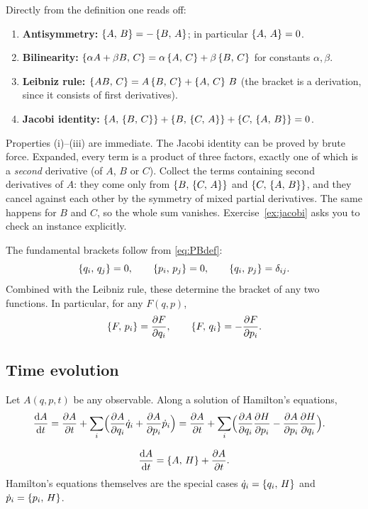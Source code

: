 \documentclass[11pt]{article}
\begin{document}
Directly from the definition one reads off:
\begin{enumerate}[label=(\roman*),nosep]
 \item \textbf{Antisymmetry:} $\left\{A,\,B\right\}=-\left\{B,\,A\right\}$; in particular $\left\{A,\,A\right\}=0$.
 \item \textbf{Bilinearity:} $\left\{\alpha A+\beta B,\,C\right\}=\alpha\left\{A,\,C\right\}+\beta\left\{B,\,C\right\}$ for constants $\alpha,\beta$.
 \item \textbf{Leibniz rule:} $\left\{AB,\,C\right\}=A\left\{B,\,C\right\}+\left\{A,\,C\right\}\,B$ (the bracket is a derivation, since it consists of first derivatives).
 \item \textbf{Jacobi identity:} $\left\{A,\,\left\{B,\,C\right\}\right\}+\left\{B,\,\left\{C,\,A\right\}\right\}+\left\{C,\,\left\{A,\,B\right\}\right\}=0$.
\end{enumerate}
Properties (i)--(iii) are immediate. The Jacobi identity can be proved by brute force. Expanded, every term is a product of three factors, exactly one of which is a \emph{second} derivative (of $A$, $B$ or $C$). Collect the terms containing second derivatives of $A$: they come only from $\left\{B,\,\left\{C,\,A\right\}\right\}$ and $\left\{C,\,\left\{A,\,B\right\}\right\}$, and they cancel against each other by the symmetry of mixed partial derivatives. The same happens for $B$ and $C$, so the whole sum vanishes. Exercise~\ref{ex:jacobi} asks you to check an instance explicitly.

The fundamental brackets follow from \eqref{eq:PBdef}:
\begin{equation}
 \left\{q_i,\,q_j\right\}=0,\qquad \left\{p_i,\,p_j\right\}=0,\qquad \left\{q_i,\,p_j\right\}=\delta_{ij}.
\label{eq:canonical}
\end{equation}
Combined with the Leibniz rule, these determine the bracket of any two functions. In particular, for any $F(q,p)$,
\begin{equation}
 \left\{F,\,p_i\right\}=\frac{\partial F}{\partial q_i},\qquad \left\{F,\,q_i\right\}=-\frac{\partial F}{\partial p_i}.
\end{equation}

\subsection{Time evolution}

Let $A(q,p,t)$ be any observable. Along a solution of Hamilton's equations,
\begin{align}
 \frac{\mathrm{d} A}{\mathrm{d} t}&=\frac{\partial A}{\partial t}+\sum_i\Bigl(\frac{\partial A}{\partial q_i}\dot q_i+\frac{\partial A}{\partial p_i}\dot p_i\Bigr)
 =\frac{\partial A}{\partial t}+\sum_i\Bigl(\frac{\partial A}{\partial q_i}\frac{\partial H}{\partial p_i}-\frac{\partial A}{\partial p_i}\frac{\partial H}{\partial q_i}\Bigr).
\end{align}

\begin{keyresult}
\begin{equation}
 \frac{\mathrm{d} A}{\mathrm{d} t}=\left\{A,\,H\right\}+\frac{\partial A}{\partial t} .
\end{equation}
Hamilton's equations themselves are the special cases $\dot q_i=\left\{q_i,\,H\right\}$ and $\dot p_i=\left\{p_i,\,H\right\}$.
\end{keyresult}
\end{document}

